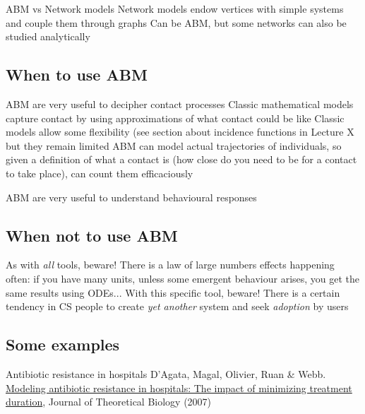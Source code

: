\documentclass[aspectratio=43]{beamer}
\begin{document}
\begin{frame}{ABM vs Network models}
Network models endow vertices with simple systems and couple them through graphs
\vfill
Can be ABM, but some networks can also be studied analytically
\end{frame} 


\subsection{When to use ABM}

\begin{frame}{ABM are very useful to decipher contact processes}
Classic mathematical models capture contact by using approximations of what contact could be like
\vfill
Classic models allow some flexibility (see section about incidence functions in Lecture X but they remain limited
\vfill
ABM can model actual trajectories of individuals, so given a definition of what a contact is (how close do you need to be for a contact to take place), can count them efficaciously
\end{frame} 

\begin{frame}{ABM are very useful to understand behavioural responses}
\end{frame} 

\subsection{When not to use ABM}

\begin{frame}{As with \emph{all} tools, beware!}
There is a law of large numbers effects happening often: if you have many units, unless some emergent behaviour arises, you get the same results using ODEs...
\vfill
With this specific tool, beware!
\vfill
There is a certain tendency in CS people to create \emph{yet another} system and seek \emph{adoption} by users
\end{frame}


\subsection{Some examples}

\begin{frame}{Antibiotic resistance in hospitals}
D’Agata, Magal, Olivier, Ruan \& Webb. \href{https://doi.org/10.1016/j.jtbi.2007.08.011}{Modeling antibiotic resistance in hospitals: The impact of minimizing treatment duration}, Journal of Theoretical Biology (2007)
\end{frame} 
\end{document}

